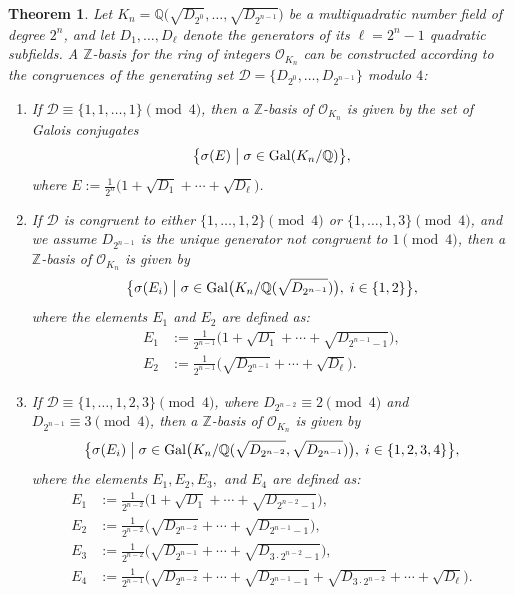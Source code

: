 \documentclass{amsart}
\newcommand{\Q}{\mathbb{Q}}
\newcommand{\Z}{\mathbb{Z}}
\theoremstyle{plain}
\newtheorem{theorem}{Theorem}[section]
\theoremstyle{definition}
\theoremstyle{remark}
\numberwithin{equation}{section}
\begin{document}
\begin{theorem} \label{thm:integral_basis}
    Let $K_n = \Q\bigl(\sqrt{D_{2^0}}, \ldots, \sqrt{D_{2^{n-1}}}\bigr)$ be a multiquadratic number field of degree $2^n$, and let $D_1, \ldots, D_{\ell}$ denote the generators of its $\ell = 2^n - 1$ quadratic subfields. A $\Z$-basis for the ring of integers $\mathcal{O}_{K_n}$ can be constructed according to the congruences of the generating set $\mathcal{D} = \{D_{2^0}, \ldots, D_{2^{n-1}}\}$ modulo $4$:
    \begin{enumerate}
        \item If $\mathcal{D} \equiv \{1, 1, \ldots, 1\} \pmod 4$, then a $\Z$-basis of $\mathcal{O}_{K_n}$ is given by the set of Galois conjugates
        \[
            \bigl\{ \sigma(E) \bigm| \sigma \in \operatorname{Gal}(K_n/\Q) \bigr\},
        \]
        where $E := \frac{1}{2^n}\bigl(1 + \sqrt{D_1} + \cdots + \sqrt{D_{\ell}}\bigr)$.
        
        \item If $\mathcal{D}$ is congruent to either $\{1, \ldots, 1, 2\} \pmod 4$ or $\{1, \ldots, 1, 3\} \pmod 4$, and we assume $D_{2^{n-1}}$ is the unique generator not congruent to $1 \pmod 4$, then a $\Z$-basis of $\mathcal{O}_{K_n}$ is given by
        \[
            \bigl\{ \sigma(E_i) \bigm| \sigma \in \operatorname{Gal}\bigl(K_n/\Q(\sqrt{D_{2^{n-1}}})\bigr), \; i \in \{1, 2\} \bigr\},
        \]
        where the elements $E_1$ and $E_2$ are defined as:
        \begin{align*}
            E_1 &:= \frac{1}{2^{n-1}}\bigl(1 + \sqrt{D_1} + \cdots + \sqrt{D_{2^{n-1}-1}}\bigr), \\
            E_2 &:= \frac{1}{2^{n-1}}\bigl(\sqrt{D_{2^{n-1}}} + \cdots + \sqrt{D_{\ell}}\bigr).
        \end{align*}

        \item If $\mathcal{D} \equiv \{1, \ldots, 1, 2, 3\} \pmod 4$, where $D_{2^{n-2}} \equiv 2 \pmod 4$ and $D_{2^{n-1}} \equiv 3 \pmod 4$, then a $\Z$-basis of $\mathcal{O}_{K_n}$ is given by
        \[
            \bigl\{ \sigma(E_i) \bigm| \sigma \in \operatorname{Gal}\bigl(K_n/\Q(\sqrt{D_{2^{n-2}}}, \sqrt{D_{2^{n-1}}})\bigr), \; i \in \{1, 2, 3, 4\} \bigr\},
        \]
        where the elements $E_1, E_2, E_3,$ and $E_4$ are defined as:
        \begin{align*}
            E_1 &:= \frac{1}{2^{n-2}}\bigl(1 + \sqrt{D_1} + \cdots + \sqrt{D_{2^{n-2}-1}}\bigr), \\
            E_2 &:= \frac{1}{2^{n-2}}\bigl(\sqrt{D_{2^{n-2}}} + \cdots + \sqrt{D_{2^{n-1}-1}}\bigr), \\
            E_3 &:= \frac{1}{2^{n-2}}\bigl(\sqrt{D_{2^{n-1}}} + \cdots + \sqrt{D_{3\cdot 2^{n-2}-1}}\bigr), \\
            E_4 &:= \frac{1}{2^{n-1}}\bigl(\sqrt{D_{2^{n-2}}} + \cdots + \sqrt{D_{2^{n-1}-1}} + \sqrt{D_{3\cdot 2^{n-2}}} + \cdots + \sqrt{D_{\ell}}\bigr).
        \end{align*}
    \end{enumerate}
\end{theorem}
\end{document}
